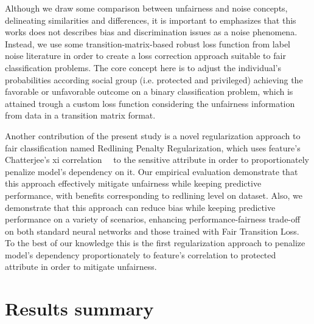 Although we draw some comparison between unfairness and noise concepts, delineating similarities and differences, it is important to emphasizes that this works does not describes bias and discrimination issues as a noise phenomena. Instead, we use some transition-matrix-based robust loss function from label noise literature in order to create a loss correction approach suitable to fair classification problems. The core concept here is to adjust the individual's probabilities according social group (i.e. protected and privileged) achieving the favorable or unfavorable outcome on a binary classification problem, which is attained trough a custom loss function considering the unfairness information from data in a transition matrix format.

Another contribution of the present study is a novel regularization approach to fair classification named Redlining Penalty Regularization, which uses feature's Chatterjee's xi correlation~~\citep{chatterjee2020new}  to the sensitive attribute in order to proportionately penalize model's dependency on it. Our empirical evaluation demonstrate that this approach effectively mitigate unfairness while keeping predictive performance, with benefits corresponding to redlining level on dataset. Also, we demonstrate that this approach can reduce bias while keeping predictive performance on a variety of scenarios, enhancing performance-fairness trade-off on both standard neural networks and those trained with Fair Transition Loss. To the best of our knowledge this is the first regularization approach to penalize model's dependency proportionately to feature's correlation to protected attribute in order to mitigate unfairness. 

\section{Results summary}

